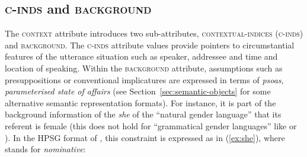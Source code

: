 \documentclass[output=paper
 	        ,biblatex
                ,babelshorthands
                ,newtxmath
                ,draftmode
                ,colorlinks, citecolor=brown
]{langscibook}
\begin{document}
\subsection{\textsc{c-inds} and \textsc{background}}
\label{sec:c-inds-background}
 
The \textsc{context}  attribute introduces two sub-attributes, \textsc{contextual-indices} (\textsc{c-inds})   and \textsc{background}. 
%
The \textsc{c-inds} attribute values provide pointers to circumstantial features of the utterance situation such as speaker, addressee and time and location of speaking.
%
Within the \textsc{background} attribute, assumptions such as presuppositions or conventional implicatures are expressed in terms of \emph{psoas}, \emph{parameterised state of affairs} (see Section~\ref{sec:semantic-objects} for some alternative semantic representation formats). 
%
For instance, it is part of the background information of the  \textit{she} of the \enquote{natural gender language}  that its referent is female (this does not hold for \enquote{grammatical gender languages} like  or ).
%
In the HPSG format of \citet[]{Pollard:Sag:1994}, this constraint is expressed as in (\ref{ex:she}), where  stands for \emph{nominative}:
%
\ea \label{ex:she}
\z
\end{document}

